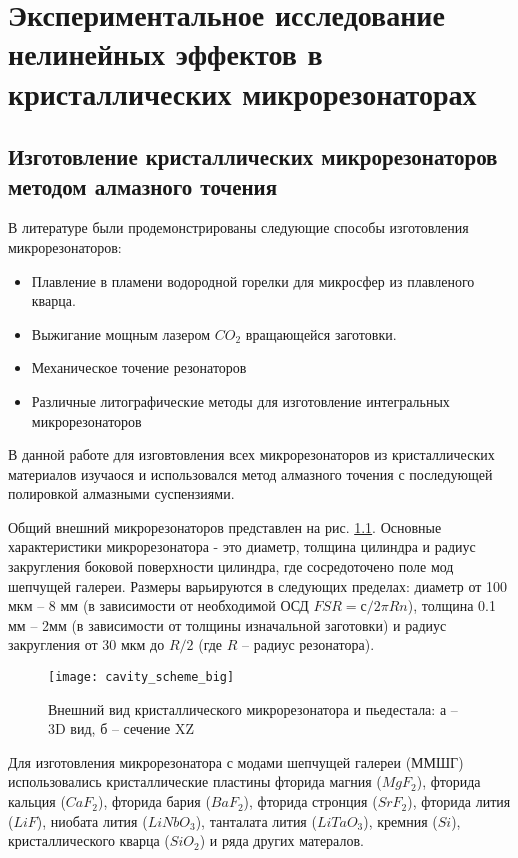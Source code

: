 \chapter{Экспериментальное исследование нелинейных эффектов в кристаллических микрорезонаторах} \label{chapt3}

\section{Изготовление кристаллических микрорезонаторов методом алмазного точения}

В литературе были продемонстрированы следующие способы изготовления микрорезонаторов:

\begin{itemize}
  \item Плавление в пламени водородной горелки для микросфер из плавленого кварца.
  \item Выжигание мощным лазером $CO_2$ вращающейся заготовки.
  \item Механическое точение резонаторов
  \item Различные литографические методы для изготовление интегральных микрорезонаторов
\end{itemize}

В данной работе для изговтовления всех микрорезонаторов из кристаллических материалов изучаося и использовался метод алмазного точения с последующей полировкой алмазными суспензиями.

Общий внешний микрорезонаторов представлен на рис. \ref{cavity_scheme_big}. Основные характеристики микрорезонатора - это диаметр, толщина цилиндра и радиус закругления боковой поверхности цилиндра, где сосредоточено поле мод шепчущей галереи.  Размеры варьируются в следующих пределах: диаметр от 100 мкм – 8 мм (в зависимости от необходимой ОСД $FSR=с/2\pi Rn$), толщина 0.1 мм – 2мм (в зависимости от толщины изначальной заготовки) и радиус закругления от 30 мкм до $R/2$ (где $R$ – радиус резонатора).

\begin{figure}[ht]
  \texttt{[image: cavity\_scheme\_big]}
  \caption{Внешний вид кристаллического микрорезонатора и пьедестала: а – 3D вид, б – сечение XZ}
  \label{cavity_scheme_big}
\end{figure}

Для изготовления микрорезонатора с модами шепчущей галереи (ММШГ) использовались кристаллические пластины фторида магния ($MgF_2$), фторида кальция ($CaF_2$), фторида бария ($BaF_2$), фторида стронция ($SrF_2$), фторида лития ($LiF$), ниобата лития ($LiNbO_3$), танталата лития ($LiTaO_3$), кремния ($Si$), кристаллического кварца ($SiO_2$) и ряда других матералов.

